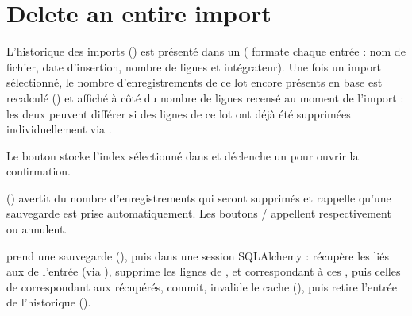 \documentclass[letterpaper,10pt,english]{sphinxmanual}
\begin{document}
\section{Delete an entire import}
\label{\detokenize{5_Management:delete-an-entire-import}}
\sphinxAtStartPar
L’historique des imports () est présenté dans un
 ( formate chaque entrée : nom de fichier, date d’insertion, nombre
de lignes et intégrateur). Une fois un import sélectionné, le nombre d’enregistrements de ce lot
encore présents en base est recalculé () et affiché à côté
du nombre de lignes recensé au moment de l’import : les deux peuvent différer si des lignes de ce
lot ont déjà été supprimées individuellement via .

\sphinxAtStartPar
Le bouton  stocke l’index sélectionné dans
 et déclenche un  pour ouvrir la
confirmation.

\sphinxAtStartPar
{} () avertit du nombre d’enregistrements qui
seront supprimés et rappelle qu’une sauvegarde est prise automatiquement. Les boutons
 /  appellent respectivement  ou
annulent.

\sphinxAtStartPar
{} prend une sauvegarde
(), puis dans une session
SQLAlchemy : récupère les  liés aux  de l’entrée (via ),
supprime les lignes de ,  et  correspondant à ces
, puis celles de  correspondant aux  récupérés, commit,
invalide le cache (), puis retire l’entrée de l’historique
().
\end{document}
